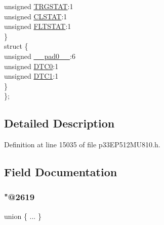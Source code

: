 \begin{DoxyCompactItemize}
\begin{tabbing}
\>\>unsigned \hyperlink{structtag_p_w_m_c_o_n5_b_i_t_s_a57c6135a12bae69a2a2cac5ed50a4a6d}{TRGSTAT}:1\\
\>\>unsigned \hyperlink{structtag_p_w_m_c_o_n5_b_i_t_s_a3ff6da0b6372a30fc64f07d769a3ddab}{CLSTAT}:1\\
\>\>unsigned \hyperlink{structtag_p_w_m_c_o_n5_b_i_t_s_ac4cd94e1f740f5bc85b265ed453769f0}{FLTSTAT}:1\\
\>\} \\
\>struct \{\\
\>\>unsigned \hyperlink{structtag_p_w_m_c_o_n5_b_i_t_s_adf71f3d8410c1f1dbbc96680a92c49af}{\_\_pad0\_\_}:6\\
\>\>unsigned \hyperlink{structtag_p_w_m_c_o_n5_b_i_t_s_a9aea5589386f8c7d9cb07683fc730825}{DTC0}:1\\
\>\>unsigned \hyperlink{structtag_p_w_m_c_o_n5_b_i_t_s_a41e45e30f2c99c731b1d2bca6060d8ad}{DTC1}:1\\
\>\} \\
\}; \\

\end{tabbing}\end{DoxyCompactItemize}


\subsection{Detailed Description}


Definition at line 15035 of file p33\+E\+P512\+M\+U810.\+h.



\subsection{Field Documentation}
\mbox{\label{structtag_p_w_m_c_o_n5_b_i_t_s_ac8dc387e58ce999444d1679b82e2ffa5}} 
\subsubsection{\texorpdfstring{"@2619}{@2619}}
{\footnotesize\ttfamily union \{ ... \} }

\mbox{\label{structtag_p_w_m_c_o_n5_b_i_t_s_adf71f3d8410c1f1dbbc96680a92c49af}} 
